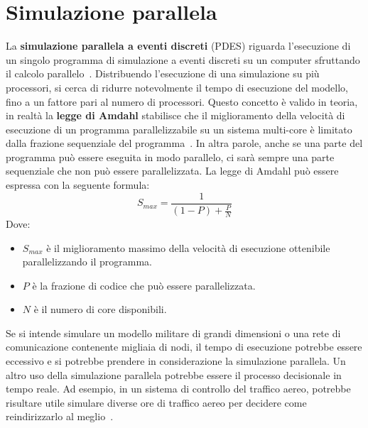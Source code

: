 \documentclass[12pt,a4paper,openright,twoside]{book}
\begin{document}
\section{Simulazione parallela}
La \textbf{simulazione parallela a eventi discreti} (PDES) riguarda l'esecuzione di un singolo programma di simulazione a eventi discreti su un computer sfruttando il calcolo parallelo~\cite{DBLP:journals/cacm/Fujimoto90}. Distribuendo l'esecuzione di una simulazione su più processori, si cerca di ridurre notevolmente il tempo di esecuzione del modello, fino a un fattore pari al numero di processori. Questo concetto è valido in teoria, in realtà la \textbf{legge di Amdahl} stabilisce che il miglioramento della velocità di esecuzione di un programma parallelizzabile su un sistema multi-core è limitato dalla frazione sequenziale del programma~\cite{DBLP:conf/afips/Amdahl67}. In altra parole, anche se una parte del programma può essere eseguita in modo parallelo, ci sarà sempre una parte sequenziale che non può essere parallelizzata. La legge di Amdahl può essere espressa con la seguente formula: 
$$
S_{max} = \frac{1}{(1-P)+\frac{P}{N}}
$$
Dove: 
\begin{itemize}
    \item $S_{max}$ è il miglioramento massimo della velocità di esecuzione ottenibile parallelizzando il programma. 
    \item $P$ è la frazione di codice che può essere parallelizzata. 
    \item $N$ è il numero di core disponibili.
\end{itemize}

Se si intende simulare un modello militare di grandi dimensioni o una rete di comunicazione contenente migliaia di nodi, il tempo di esecuzione potrebbe essere eccessivo e si potrebbe prendere in considerazione la simulazione parallela. Un altro uso della simulazione parallela potrebbe essere il processo decisionale in tempo reale. Ad esempio, in un sistema di controllo del traffico aereo, potrebbe risultare utile simulare diverse ore di traffico aereo per decidere come reindirizzarlo al meglio~\cite{DBLP:conf/wsc/Wieland98}. 
\end{document}
